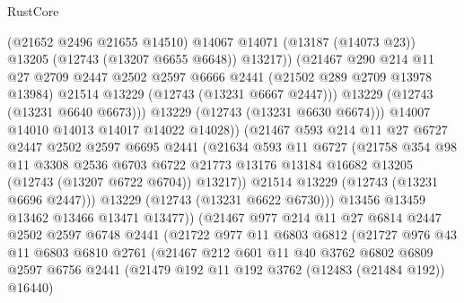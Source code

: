 \begin{lexlean}{RustCore}
\begin{coremodule}
                        (@21652 @2496 @21655 @14510)
                        @14067
                        @14071
                        (@13187 (@14073 @23))
                        @13205
                        (@12743 (@13207 @6655 @6648))
                        @13217))
                    (@21467
                      @290
                      @214
                      @11
                      @27
                      @2709
                      @2447
                      @2502
                      @2597
                      @6666
                      @2441
                      (@21502 @289 @2709 @13978 @13984)
                      @21514
                      @13229
                      (@12743 (@13231 @6667 @2447)))
                    @13229
                    (@12743 (@13231 @6640 @6673)))
                  @13229
                  (@12743 (@13231 @6630 @6674)))
                @14007
                @14010
                @14013
                @14017
                @14022
                @14028))
            (@21467
              @593
              @214
              @11
              @27
              @6727
              @2447
              @2502
              @2597
              @6695
              @2441
              (@21634
                @593
                @11
                @6727
                (@21758
                  @354
                  @98
                  @11
                  @3308
                  @2536
                  @6703
                  @6722
                  @21773
                  @13176
                  @13184
                  @16682
                  @13205
                  (@12743 (@13207 @6722 @6704))
                  @13217))
              @21514
              @13229
              (@12743 (@13231 @6696 @2447)))
            @13229
            (@12743 (@13231 @6622 @6730)))
          @13456
          @13459
          @13462
          @13466
          @13471
          @13477))
      (@21467
        @977
        @214
        @11
        @27
        @6814
        @2447
        @2502
        @2597
        @6748
        @2441
        (@21722
          @977
          @11
          @6803
          @6812
          (@21727
            @976
            @43
            @11
            @6803
            @6810
            @2761
            (@21467
              @212
              @601
              @11
              @40
              @3762
              @6802
              @6809
              @2597
              @6756
              @2441
              (@21479 @192 @11 @192 @3762 (@12483 (@21484 @192)) @16440)

\end{coremodule}
\end{lexlean}
